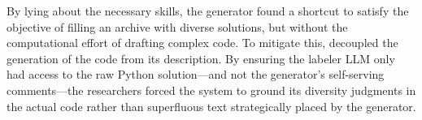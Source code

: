 By lying about the necessary skills, the generator found a shortcut to satisfy the objective of filling an archive with diverse solutions, but without the computational effort of drafting complex code. 
To mitigate this, \citeauthor{pourcel2024acesgeneratingdiverseprogramming} decoupled the generation of the code from its description. 
By ensuring the labeler LLM only had access to the raw Python solution---and not the generator's self-serving comments---the researchers forced the system to ground its diversity judgments in the actual code rather than superfluous text strategically placed by the generator.
